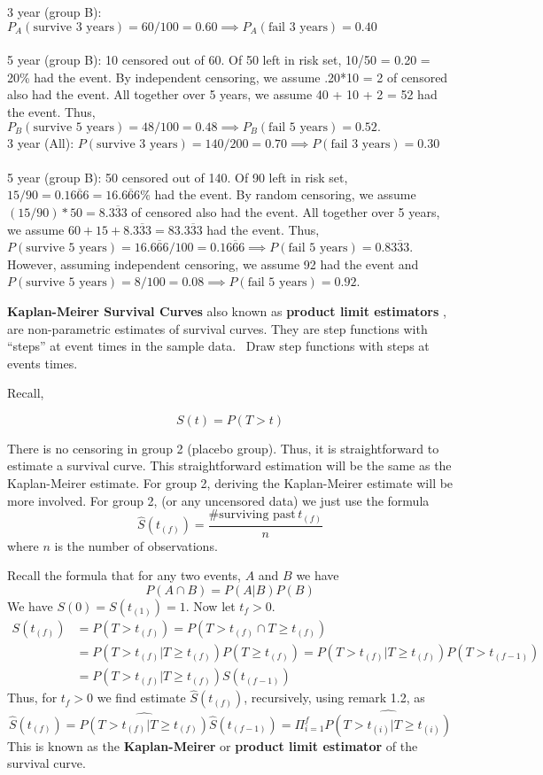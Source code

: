 \documentclass{article}
\begin{document}
3 year (group B): $P_A(\text{survive 3 years})= 60/100 = 0.60 \implies P_A(\text{fail 3 years}) = 0.40$ \\ \\
5 year (group B): 10 censored out of 60. Of 50 left in risk set, 10/50 = 0.20 = 20\% had the event. By independent censoring, we assume .20*10 = 2 of censored also had the event. All together over 5 years, we assume 40 + 10 + 2 = 52 had the event. Thus, $P_B(\text{survive 5 years})= 48/100 = 0.48 \implies P_B(\text{fail 5 years}) = 0.52.$ \\


3 year (All): $P(\text{survive 3 years})= 140/200 = 0.70 \implies P(\text{fail 3 years}) = 0.30$ \\ \\
5 year (group B): 50 censored out of 140. Of 90 left in risk set, $15/90 = 0.1\overline{666} = 16.\overline{666}\%$ had the event. By random censoring, we assume $(15/90)*50 = 8.\overline{333}$ of censored also had the event. All together over 5 years, we assume $60 + 15 + 8.\overline{333} = 83.\overline{333}$ had the event. Thus, $P(\text{survive 5 years})= 16.\overline{666}/100 = 0.1\overline{666} \implies P(\text{fail 5 years}) = 0.8\overline{333}$. However, assuming independent censoring, we assume 92 had the event and  $P(\text{survive 5 years})= 8/100 = 0.08 \implies P(\text{fail 5 years}) = 0.92$.




 \textbf{Kaplan-Meirer Survival Curves } also known as \textbf{ product limit estimators }, are non-parametric estimates of survival curves. They are step functions with ``steps'' at event times in the sample data.
\NTS \, Draw step functions with steps at events times.

 Recall,

\[
S(t) = P(T>t)
\]

There is no censoring in group 2 (placebo group). Thus, it is straightforward to estimate a survival curve. This straightforward estimation will be the same as the Kaplan-Meirer estimate. For group 2, deriving the Kaplan-Meirer estimate will be more involved. For group 2, (or any uncensored data) we just use the formula
\[
\hat{S}(t_{(f)}) = \frac{\# \text{surviving past} \, t_{(f)}}{n}
\]
where $n$ is the number of observations.

 Recall the formula that for any two events, $A$ and $B$ we have
\[
P(A \cap B) = P(A|B)P(B)
\]
We have $S(0) = S(t_{(1)}) = 1$.
Now let $t_{f}>0$.
\begin{align*}
S(t_{(f)}) & = P(T > t_{(f)}) = P(T>t_{(f)} \cap T \ge t_{(f)}) \\
& = P(T>t_{(f)} | T \ge t_{(f)}) P(T \ge t_{(f)}) = P(T>t_{(f)} | T \ge t_{(f)}) P(T > t_{(f-1)})  \\
& = P(T>t_{(f)} | T \ge t_{(f)}) S(t_{(f-1)})
\end{align*}
Thus, for $t_{f}>0$ we find estimate  $\hat{S}(t_{(f)})$, recursively, using remark 1.2, as
\[
 \hat{S}(t_{(f)}) = \widehat{P(T>t_{(f)} | T \ge t_{(f)})} \hat{S}(t_{(f-1)}) = \Pi_{i=1}^f \hat{P(T>t_{(i)}|T \ge t_{(i)})}
 \]
This is known as the  \textbf{Kaplan-Meirer} or \textbf{ product limit estimator } of the survival curve.
\end{document}
